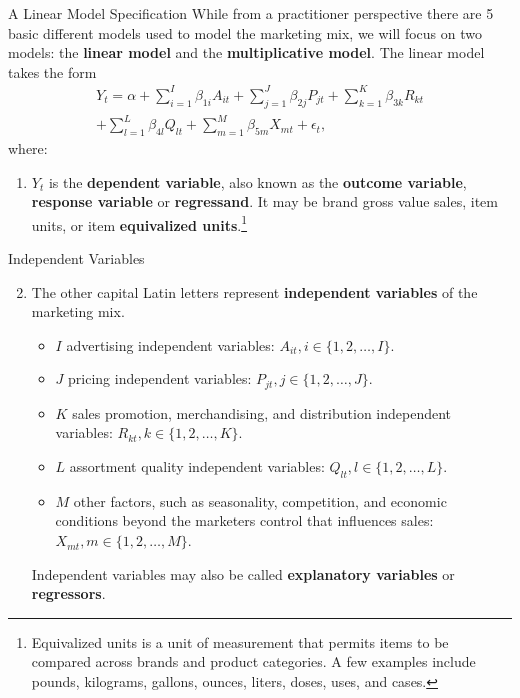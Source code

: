 \documentclass[pdf]{beamer}
\newcommand{\empr}[1]{{\color{franklinblue}\textbf{#1}}}
\theoremstyle{remark}
\theoremstyle{definition}
\begin{document}
\begin{frame}[t]{A Linear Model Specification}
While from a practitioner perspective there are 5 basic  different models used to model the marketing mix, we will focus on two models: the \empr{linear model} and the \empr{multiplicative model}.  The linear model takes the form \\
\vspace{-3.0ex}
\small
\begin{multline} \label{eq:1}
Y_{t} = \alpha + \sum_{i=1}^{I}\beta_{1i} A_{it} + \sum_{j=1}^{J}\beta_{2j} P_{jt} + \sum_{k=1}^{K}\beta_{3k}R_{kt} \\ 
 + \sum_{l=1}^{L}\beta_{4l}Q_{lt} + \sum_{m=1}^{M}\beta_{5m}X_{mt} + \epsilon_t,
 \end{multline}
 \normalsize
where:
\vspace{-1.5ex}
\small
\begin{enumerate}
 \item $Y_t$ is the \empr{dependent variable}, also known as the \empr{outcome variable}, \empr{response variable} or  \empr{regressand}. It may be brand gross value sales, item units, or item \empr{equivalized units}.\footnote{Equivalized units is a unit of measurement that permits items to be compared across brands and product categories.  A few examples include pounds, kilograms, gallons,  ounces, liters, doses, uses, and cases.}
\end{enumerate}
\end{frame}

\begin{frame}[t]{Independent Variables}
 \small
 \begin{enumerate}
\setcounter{enumi}{1} 
 \item The other capital Latin letters represent \empr{independent variables} of the marketing mix.
    \begin{itemize}
          \vspace{1.0ex}
          \item $I$ advertising independent variables: $A_{it}, i \in \{1,2,\ldots, I\}$.
          \vspace{1.0ex}
          \item $J$ pricing independent variables: $P_{jt}, j \in \{1,2,\ldots, J\}$.
          \vspace{1.0ex}
          \item $K$ sales promotion, merchandising, and distribution independent variables: $R_{kt}, k \in \{1,2,\ldots, K\}$.
          \vspace{1.0ex}
          \item $L$ assortment quality independent variables: $Q_{lt}, l \in \{1,2,\ldots, L\}$.
          \vspace{1.0ex}
          \item $M$ other factors, such as seasonality, competition, and economic conditions beyond the marketers control that influences sales:  $X_{mt}, m \in \{1,2,\ldots, M\}$. 
    \end{itemize} 
    Independent variables may also be called \empr{explanatory variables} or \empr{regressors}.
\end{enumerate}
\end{frame}
\end{document}
